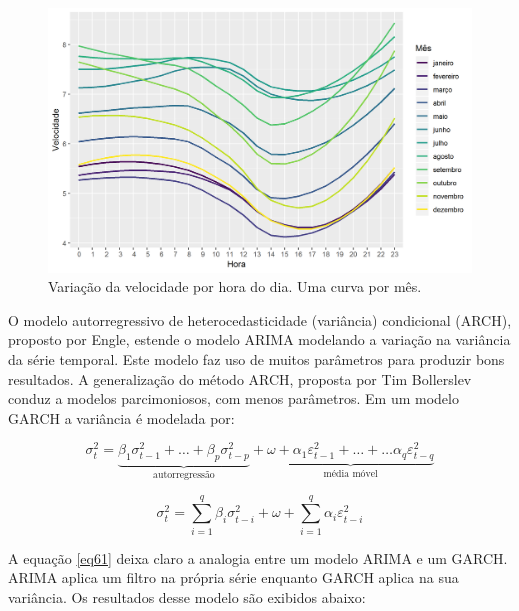 \documentclass[
	12pt,				%
	openright,			%
	oneside,			%
	a4paper,			%
	english,			%
	french,				%
	spanish,			%
	brazil				%
	]{abntex2}
\begin{document}
\begin{figure}[h]
    \centering
	\includegraphics[width=\textwidth]{diurnal}
	\caption{Variação da velocidade por hora do dia. Uma curva por mês.}
\end{figure}
\FloatBarrier

O modelo autorregressivo de heterocedasticidade (variância) condicional (ARCH), proposto por Engle, \cite{engle} estende o modelo ARIMA modelando a variação na variância da série temporal. Este modelo faz uso de muitos parâmetros para produzir bons resultados. A generalização do método ARCH, proposta por Tim Bollerslev \cite{boller} conduz a modelos parcimoniosos, com menos parâmetros. Em um modelo GARCH a variância é modelada por:

\begin{equation}\label{eq61}
\sigma_t^2 = \underbrace{\beta_1\sigma_{t-1}^2 + \dots + \beta_p\sigma_{t-p}^2}_\text{autorregressão}  + \underbrace{\omega + \alpha_1\varepsilon_{t-1}^2 + \dots + \dots \alpha_q\varepsilon_{t-q}^2}_\text{média móvel} 
\end{equation}

\begin{equation}
\sigma_t^2 = \sum\limits_{i=1}^q\beta_i\sigma_{t-i}^2 + \omega + \sum\limits_{i=1}^q\alpha_i\varepsilon_{t-i}^2
\end{equation}

A equação \ref{eq61} deixa claro a analogia entre um modelo ARIMA e um GARCH. ARIMA aplica um filtro na própria série enquanto GARCH aplica na sua variância. Os resultados desse modelo são exibidos abaixo:
\end{document}
